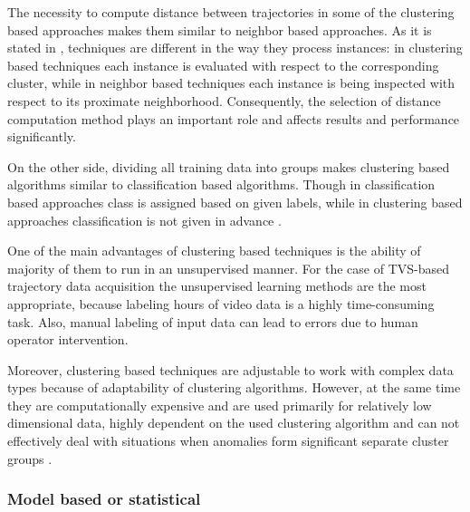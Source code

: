 The necessity to compute distance between trajectories in some of the clustering based approaches makes them similar to neighbor based approaches. As it is stated in \cite{article:15_survey_ad}, techniques are different in the way they process instances: in clustering based techniques each instance is evaluated with respect to the corresponding cluster, while in neighbor based techniques each instance is being inspected with respect to its proximate neighborhood. Consequently, the selection of distance computation method plays an important role and affects results and performance significantly.

On the other side, dividing all training data into groups makes clustering based algorithms similar to classification based algorithms. Though in classification based approaches class is assigned based on given labels, while in clustering based approaches classification is not given in advance \cite{inproceedings:18_ardod_lstd}.

One of the main advantages of clustering based techniques is the ability of majority of them to run in an unsupervised manner. For the case of TVS-based trajectory data acquisition the unsupervised learning methods are the most appropriate, because labeling hours of video data is a highly time-consuming task. Also, manual labeling of input data can lead to errors due to human operator intervention.

Moreover, clustering based techniques are adjustable to work with complex data types because of adaptability of clustering algorithms. However, at the same time they are computationally expensive and are used primarily for relatively low dimensional data, highly dependent on the used clustering algorithm and can not effectively deal with situations when anomalies form significant separate cluster groups \cite{article:15_survey_ad}.

\subsubsection{Model based \cite{article:6_survey_anom_det_rtuvs}\cite{inproceedings:18_ardod_lstd} or statistical \cite{article:15_survey_ad}}

